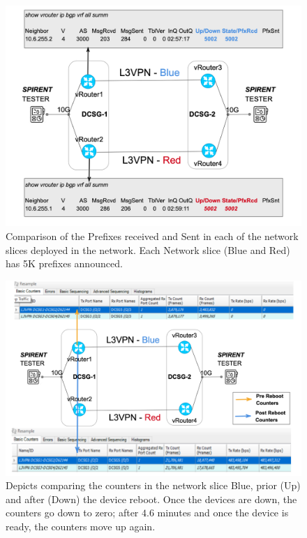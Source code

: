\documentclass[journal,article,submit,moreauthors,pdftex]{Definitions/mdpi}
\begin{document}
\begin{figure}[htb]
\includegraphics[width=\linewidth]{Figs/sliceresults.png}
\caption{Comparison of the Prefixes received and Sent in each of the network slices deployed in the network. Each Network slice (Blue and Red) has 5K prefixes announced.}
\label{fig:sliceresults}
\end{figure}

\begin{figure}[htb]
\includegraphics[width=\linewidth]{Figs/sliceresults2.png}
\caption{Depicts comparing the counters in the network slice Blue,  prior (Up) and after (Down) the device reboot. Once the devices are down, the counters go down to zero; after $4.6$ minutes and once the device is ready, the counters move up again. }
\label{fig:sliceresults2}
\end{figure}
\end{document}
